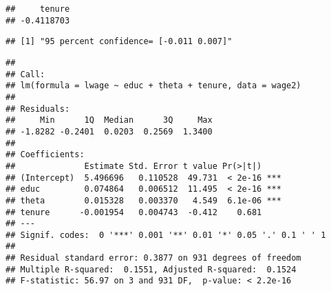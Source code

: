 \documentclass[
]{article}
\newenvironment{Shaded}{\begin{snugshade}}{\end{snugshade}}
\newcommand{\CommentTok}[1]{\textcolor[rgb]{0.56,0.35,0.01}{\textit{#1}}}
\newcommand{\DataTypeTok}[1]{\textcolor[rgb]{0.13,0.29,0.53}{#1}}
\newcommand{\DecValTok}[1]{\textcolor[rgb]{0.00,0.00,0.81}{#1}}
\newcommand{\FloatTok}[1]{\textcolor[rgb]{0.00,0.00,0.81}{#1}}
\newcommand{\KeywordTok}[1]{\textcolor[rgb]{0.13,0.29,0.53}{\textbf{#1}}}
\newcommand{\NormalTok}[1]{#1}
\newcommand{\OperatorTok}[1]{\textcolor[rgb]{0.81,0.36,0.00}{\textbf{#1}}}
\newcommand{\StringTok}[1]{\textcolor[rgb]{0.31,0.60,0.02}{#1}}
\begin{document}
\begin{verbatim}
##     tenure 
## -0.4118703
\end{verbatim}

\begin{Shaded}
\end{Shaded}

\begin{verbatim}
## [1] "95 percent confidence= [-0.011 0.007]"
\end{verbatim}

\begin{Shaded}
\end{Shaded}

\begin{verbatim}
## 
## Call:
## lm(formula = lwage ~ educ + theta + tenure, data = wage2)
## 
## Residuals:
##     Min      1Q  Median      3Q     Max 
## -1.8282 -0.2401  0.0203  0.2569  1.3400 
## 
## Coefficients:
##              Estimate Std. Error t value Pr(>|t|)    
## (Intercept)  5.496696   0.110528  49.731  < 2e-16 ***
## educ         0.074864   0.006512  11.495  < 2e-16 ***
## theta        0.015328   0.003370   4.549  6.1e-06 ***
## tenure      -0.001954   0.004743  -0.412    0.681    
## ---
## Signif. codes:  0 '***' 0.001 '**' 0.01 '*' 0.05 '.' 0.1 ' ' 1
## 
## Residual standard error: 0.3877 on 931 degrees of freedom
## Multiple R-squared:  0.1551, Adjusted R-squared:  0.1524 
## F-statistic: 56.97 on 3 and 931 DF,  p-value: < 2.2e-16
\end{verbatim}
\end{document}
